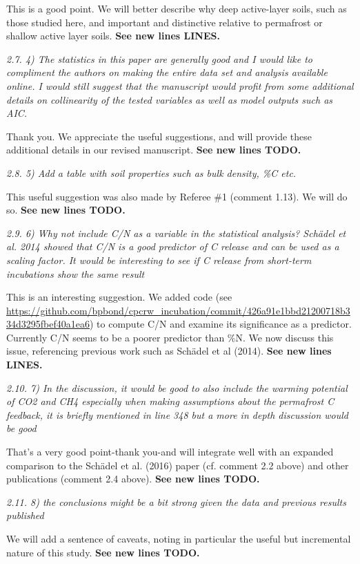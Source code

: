 \documentclass[11pt, oneside]{article}
\begin{document}
This is a good point. We will better describe why deep active-layer soils, such as those studied here, and important and distinctive relative to permafrost or shallow active layer soils.  {\bf See new lines LINES.}

\medskip
{\it 2.7. 4) The statistics in this paper are generally good and I would like to compliment the authors on making the entire data set and analysis available online. I would still suggest that the manuscript would profit from some additional details on collinearity of the tested variables as well as model outputs such as AIC. }

Thank you. We appreciate the useful suggestions, and will provide these additional details in our revised manuscript. {\bf See new lines TODO.}

\medskip
{\it 2.8. 5) Add a table with soil properties such as bulk density, \%C etc. }

This useful suggestion was also made by Referee \#1 (comment 1.13). We will do so. {\bf See new lines TODO.}

\medskip
{\it 2.9. 6) Why not include C/N as a variable in the statistical analysis? Schädel et al. 2014 showed that C/N is a good predictor of C release and can be used as a scaling factor. It would be interesting to see if C release from short-term incubations show the same result }

This is an interesting suggestion. We added code (see \url{https://github.com/bpbond/cpcrw_incubation/commit/426a91e1bbd21200718b334d3295fbef40a1ea6}) to compute C/N and examine its significance as a predictor. Currently C/N seems to be a poorer predictor than \%N. We now discuss this issue, referencing previous work such as Schädel et al (2014). {\bf See new lines LINES.}

\medskip
{\it 2.10. 7) In the discussion, it would be good to also include the warming potential of CO2 and CH4 especially when making assumptions about the permafrost C feedback, it is briefly mentioned in line 348 but a more in depth discussion would be good }

That's a very good point-thank you-and will integrate well with an expanded comparison to the Schädel et al. (2016) paper (cf. comment 2.2 above) and other publications (comment 2.4 above). {\bf See new lines TODO.}

\medskip
{\it 2.11. 8) the conclusions might be a bit strong given the data and previous results published }

We will add a sentence of caveats, noting in particular the useful but incremental nature of this study. {\bf See new lines TODO.}
\end{document}
